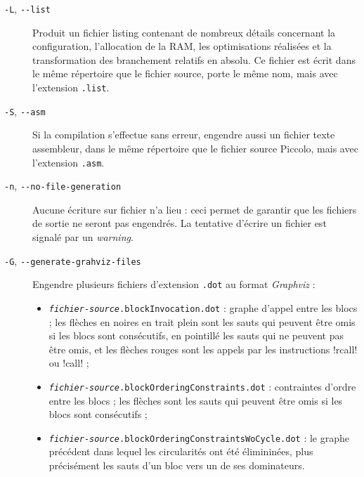 \begin{description}
  \item[\texttt{-L}, \texttt{-{-}list}] Produit un fichier listing contenant de nombreux détails concernant la configuration, l’allocation de la RAM, les optimisations réalisées et la transformation des branchement relatifs en absolu. Ce fichier est écrit dans le même répertoire que le fichier source, porte le même nom, mais avec l’extension \texttt{.list}.

  \item[\texttt{-S}, \texttt{-{-}asm}] Si la compilation s’effectue sans erreur, engendre aussi un fichier texte assembleur, dans le même répertoire que le fichier source Piccolo, mais avec l’extension \texttt{.asm}.

  \item[\texttt{-n}, \texttt{-{-}no-file-generation}] Aucune écriture sur fichier n’a lieu : ceci permet de garantir que les fichiers de sortie ne seront pas engendrés. La tentative d’écrire un fichier est signalé par un \emph{warning}.




  \item[\texttt{-G}, \texttt{-{-}generate-grahviz-files}] Engendre plusieurs fichiers d'extension \texttt{.dot} au format \emph{Graphviz} :
\begin{itemize}
\item \texttt{\emph{fichier-source}.blockInvocation.dot} : graphe d'appel entre les blocs ; les flèches en noires en trait plein sont les sauts qui peuvent être omis si les blocs sont consécutifs, en pointillé les sauts qui ne peuvent pas être omis, et les flèches rouges sont les appels par les instructions \pic!rcall! ou \pic!call! ; 
\item \texttt{\emph{fichier-source}.blockOrderingConstraints.dot} : contraintes d'ordre entre les blocs ; les flèches sont les sauts qui peuvent être omis si les blocs sont consécutifs ; 
\item \texttt{\emph{fichier-source}.blockOrderingConstraintsWoCycle.dot} : le graphe précédent dans lequel les circularités ont été élimininées, plus précisément les sauts d'un bloc vers un de ses dominateurs. 
\end{itemize}


\end{description}
